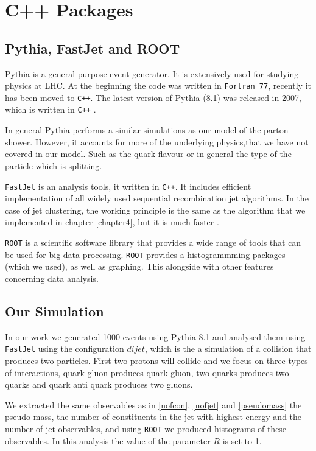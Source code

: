 \chapter{C++ Packages}\label{chap6}
\section{Pythia, FastJet and ROOT}
Pythia is a general-purpose event generator. It is extensively used for studying physics at LHC. At the beginning the code was written in \verb+Fortran 77+, recently it has been moved to \verb!C++!. The latest version of Pythia (8.1) was released in 2007, which is written in \verb!C++!  \citep{Buckley:2011ms}.

In general Pythia performs a similar simulations as our model of the parton shower.
However, it accounts for more of the underlying physics,that we have not covered in our model. Such  as the quark flavour or in general the type of the particle which is splitting.  


\verb+FastJet+ is an analysis tools, it written in \verb!C++!. It includes efficient implementation of all widely used sequential recombination jet algorithms. In the case of jet clustering, the working principle is the same as the algorithm that we implemented in chapter \ref{chapter4},
but it is much faster \citep{Buckley:2011ms}. 

\verb+ROOT+ is a scientific software library that provides a wide range of tools that can be used for big data processing. \verb+ROOT+ provides a histogrammming packages (which we used), as well as graphing. This alongside with other features concerning data analysis.  
\section{Our Simulation}
In our work we generated 1000 events using Pythia 8.1 and analysed them using \verb+FastJet+ using the configuration $dijet$, which is the a simulation of a collision that produces two particles. First two protons will collide and we focus on three types of  interactions, quark gluon produces quark gluon, two quarks produces two quarks and quark anti quark produces two gluons.    

We extracted the same  observables as in \ref{nofcon}, \ref{nofjet} and \ref{pseudomass}  the pseudo-mass, the number of constituents in the jet with highest energy and the number of jet observables, and using \verb+ROOT+ we produced histograms of these observables. In this analysis the value of the parameter $R$ is set to 1.

